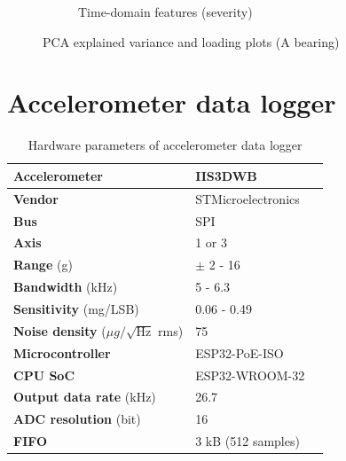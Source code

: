 \begin{figure}[h]
\begin{subfigure}[b]{0.48\textwidth}
        \caption{Time-domain features (severity)}
    \end{subfigure} 
    \caption{PCA explained variance and loading plots (A bearing)}
\end{figure}



\section{Accelerometer data logger}

\begin{table}[h]
\renewcommand{\arraystretch}{1.2}
\centering
\begin{tabular}{|l|l|l|}
\hline
\textbf{Accelerometer}                           & \textbf{IIS3DWB}   \\ \hline
\textbf{Vendor}                                  & STMicroelectronics \\ \hline
\textbf{Bus}                                     & SPI                \\ \hline
\textbf{Axis}                                    & 1 or 3             \\ \hline
\textbf{Range} (g)                               & $\pm$ 2 - 16      \\ \hline
\textbf{Bandwidth} (kHz)                          & 5 - 6.3            \\ \hline
\textbf{Sensitivity} (mg/LSB)                    & 0.06 - 0.49       \\ \hline
\textbf{Noise density} ($\mu g / \sqrt{\mathrm{Hz}}$ rms) & 75                 \\ \hline
\textbf{Microcontroller}                         & ESP32-PoE-ISO      \\ \hline
\textbf{CPU SoC}                                 & ESP32-WROOM-32     \\ \hline
\textbf{Output data rate} (kHz)                  & 26.7               \\ \hline
\textbf{ADC resolution} (bit)                    & 16                 \\ \hline
\textbf{FIFO}                                    & 3 kB (512 samples) \\ \hline
\end{tabular}
\caption{Hardware parameters of accelerometer data logger}
\label{tab:design:hw-sensors}
\end{table}


